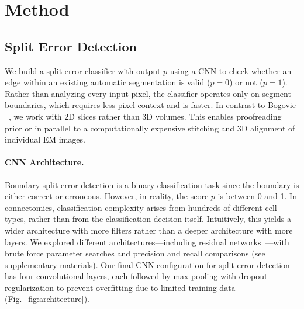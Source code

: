 

\section{Method}
\label{sec:methods}

\subsection{Split Error Detection}
\label{sec:spliterrordetection}

We build a split error classifier with output $p$ using a CNN to check whether an edge within an existing automatic segmentation is valid ($p=0$) or not ($p=1$). Rather than analyzing every input pixel, the classifier operates only on segment boundaries, which requires less pixel context and is faster. In contrast to Bogovic \etal~\cite{BogovicHJ13}, we work with 2D slices rather than 3D volumes. This enables proofreading prior or in parallel to a computationally expensive stitching and 3D alignment of individual EM images.

\paragraph{CNN Architecture.} Boundary split error detection is a binary classification task since the boundary is either correct or erroneous. However, in reality, the score $p$ is between 0 and 1. In connectomics, classification complexity arises from hundreds of different cell types, rather than from the classification decision itself. Intuitively, this yields a wider architecture with more filters rather than a deeper architecture with more layers. We explored different architectures---including residual networks~\cite{resnet}---with brute force parameter searches and precision and recall comparisons (see supplementary materials). Our final CNN configuration for split error detection has four convolutional layers, each followed by max pooling with dropout regularization to prevent overfitting due to limited training data (Fig.~\ref{fig:architecture}).

